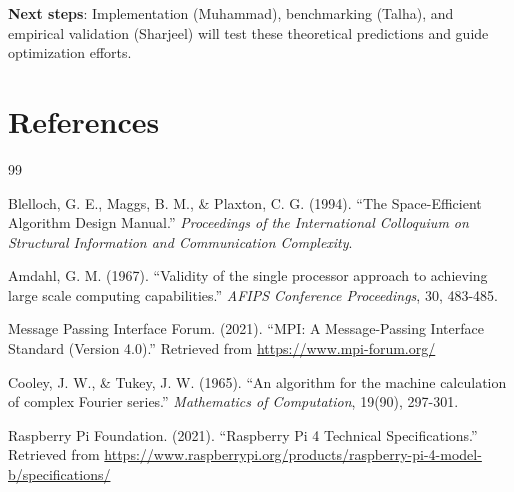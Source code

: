 \documentclass[11pt,a4paper]{article}
\theoremstyle{definition}
\begin{document}
\textbf{Next steps}: Implementation (Muhammad), benchmarking (Talha), and empirical validation (Sharjeel) will test these theoretical predictions and guide optimization efforts.

\section*{References}

\begin{thebibliography}{99}

 Blelloch, G. E., Maggs, B. M., \& Plaxton, C. G. (1994). 
``The Space-Efficient Algorithm Design Manual.'' 
\textit{Proceedings of the International Colloquium on Structural Information and Communication Complexity}.

 Amdahl, G. M. (1967). 
``Validity of the single processor approach to achieving large scale computing capabilities.'' 
\textit{AFIPS Conference Proceedings}, 30, 483-485.

 Message Passing Interface Forum. (2021). 
``MPI: A Message-Passing Interface Standard (Version 4.0).'' 
Retrieved from \url{https://www.mpi-forum.org/}

 Cooley, J. W., \& Tukey, J. W. (1965). 
``An algorithm for the machine calculation of complex Fourier series.'' 
\textit{Mathematics of Computation}, 19(90), 297-301.

 Raspberry Pi Foundation. (2021). 
``Raspberry Pi 4 Technical Specifications.'' 
Retrieved from \url{https://www.raspberrypi.org/products/raspberry-pi-4-model-b/specifications/}

\end{thebibliography}
\end{document}
